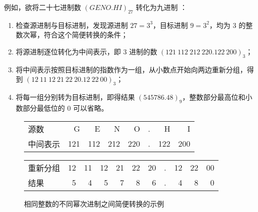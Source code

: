         例如，欲将二十七进制数 $(GENO.HI)_{27}$ 转化为九进制 ：
        \begin{enumerate}
            \item 检查源进制与目标进制，发现源进制 $27 = 3 ^ 3$，目标进制 $9 = 3 ^ 2$，均为 $3$ 的整数次幂，符合这个简便转换的条件；
            \item 将源进制逐位转化为中间表示，即 $3$ 进制的数 $(121\ 112\ 212\ 220.122\ 200)_3$；
            \item 将中间表示按照目标进制的指数作为一组，从小数点开始向两边重新分组，得到 $(12\ 11\ 12\ 21\ 22\ 20.12\ 22\ 00)_3$；
            \item 将每一组分别转为目标进制，即得结果 $(545786.48)_9$，整数部分最高位和小数部分最低位的 $0$ 可以省略。
        \end{enumerate}

        \begin{figure}
            \centering
            \begin{tabular}{lrrrrrrr}
                源数     &   G &   E &   N &   O & . &   H &   I \\
                中间表示 & 121 & 112 & 212 & 220 & . & 122 & 200 \\ \hline
            \end{tabular}
            \begin{tabular}{lrrrrrrrrrr}
                重新分组 & 12 & 11 & 12 & 21 & 22 & 20 & . & 12 & 22 & 00 \\
                结果     &  5 &  4 &  5 &  7 &  8 &  6 & . &  4  &  8 &  0
            \end{tabular}
            \caption{相同整数的不同幂次进制之间简便转换的示例}
            \label{fig:NumberSystemBasics/positional-notation-conversion/powered-base/with-intermediate}
        \end{figure}
